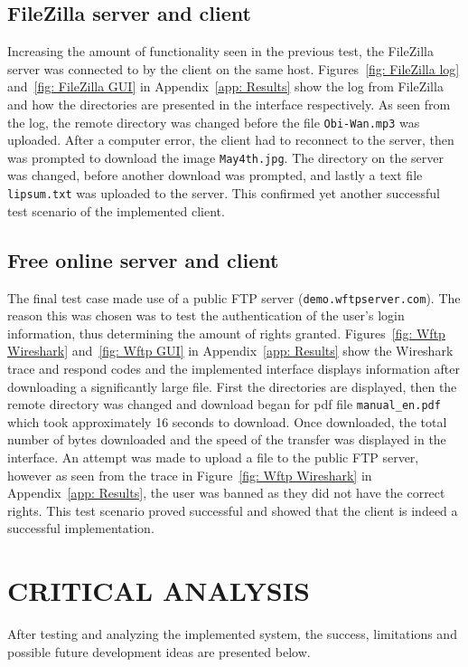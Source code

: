 \documentclass[10pt,twocolumn]{witseiepaper}
\def\code#1{\texttt{#1}}
\begin{document}
\subsection{FileZilla server and client}
\label{sec: Results FileZilla}
Increasing the amount of functionality seen in the previous test, the FileZilla server was connected to by the client on the same host. Figures~\ref{fig: FileZilla log} and~\ref{fig: FileZilla GUI} in Appendix~\ref{app: Results} show the log from FileZilla and how the directories are presented in the interface respectively. As seen from the log, the remote directory was changed before the file \code{Obi-Wan.mp3} was uploaded. After a computer error, the client had to reconnect to the server, then was prompted to download the image \code{May4th.jpg}. The directory on the server was changed, before another download was prompted, and lastly a text file \code{lipsum.txt} was uploaded to the server. This confirmed yet another successful test scenario of the implemented client.


\subsection{Free online server and client}
\label{sec: Results Online}
The final test case made use of a public FTP server (\code{demo.wftpserver.com}). The reason this was chosen was to test the authentication of the user's login information, thus determining the amount of rights granted. Figures~\ref{fig: Wftp Wireshark} and~\ref{fig: Wftp GUI} in Appendix~\ref{app: Results} show the Wireshark trace and respond codes and the implemented interface displays information after downloading a significantly large file. First the directories are displayed, then the remote directory was changed and download began for pdf file \code{manual\_en.pdf} which took approximately 16 seconds to download. Once downloaded, the total number of bytes downloaded and the speed of the transfer was displayed in the interface. An attempt was made to upload a file to the public FTP server, however as seen from the trace in Figure~\ref{fig: Wftp Wireshark} in Appendix~\ref{app: Results}, the user was banned as they did not have the correct rights. This test scenario proved successful and showed that the client is indeed a successful implementation.


%
\section{CRITICAL ANALYSIS}
\label{sec: Critical Analysis}
After testing and analyzing the implemented system, the success, limitations and possible future development ideas are presented below.
\end{document}
